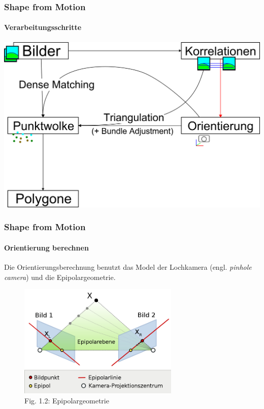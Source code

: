 \documentclass{beamer}
\begin{document}
\begin{frame}
	\frametitle{Shape from Motion}
	\framesubtitle{Verarbeitungsschritte}

	\includegraphics[width=\linewidth]{includes/shape-from-motion_process_2}
\end{frame}


\begin{frame}
	\frametitle{Shape from Motion}
	\framesubtitle{Orientierung berechnen}

	\vspace{1em}
	Die Orientierungsberechnung benutzt das Model der Lochkamera (engl. \textit{pinhole camera}) und die Epipolargeometrie.

	\begin{figure}
		\includegraphics[width=217pt]{includes/Epipolargeometrie3}\\
		{\scriptsize Fig. 1.2: Epipolargeometrie}
	\end{figure}
\end{frame}
\end{document}
